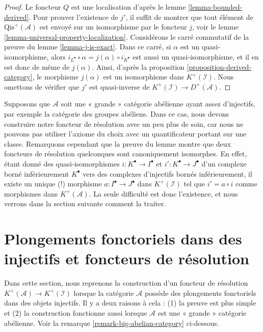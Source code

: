 \begin{proof}
Le foncteur $Q$ est une localisation d'après le
lemme \ref{lemma-bounded-derived}. Pour prouver l'existence de $j'$, il suffit
de montrer que tout élément de $\text{Qis}^{+}(\mathcal{A})$ est envoyé sur
un isomorphisme par le foncteur $j$, voir le
lemme \ref{lemma-universal-property-localization}.
Considérons le carré commutatif de la preuve du
lemme \ref{lemma-j-is-exact}. Dans ce carré, si $\alpha$ est un
quasi-isomorphisme, alors
$i_{L^\bullet}\circ\alpha=j(\alpha)\circ i_{K^\bullet}$ est aussi un
quasi-isomorphisme, et il en est donc de même de $j(\alpha)$. Ainsi, d'après
la proposition \ref{proposition-derived-category}, le morphisme $j(\alpha)$
est un isomorphisme dans $K^+(\mathcal{I})$. Nous omettons de vérifier que
$j'$ est quasi-inverse de
$K^{+}(\mathcal{I}) \to D^{+}(\mathcal{A})$.
\end{proof}

\begin{remark}
\label{remark-big-localization}
Supposons que $\mathcal{A}$ soit une « grande » catégorie abélienne ayant
assez d'injectifs, par exemple la catégorie des groupes abéliens. Dans ce cas,
nous devons construire notre foncteur de résolution avec un peu plus de soin,
car nous ne pouvons pas utiliser l'axiome du choix avec un quantificateur
portant sur une classe. Remarquons cependant que la preuve du lemme montre que
deux foncteurs de résolution quelconques sont canoniquement isomorphes. En
effet, étant donné des quasi-isomorphismes
$i : K^\bullet \to I^\bullet$ et $i' : K^\bullet \to J^\bullet$ d'un
complexe borné inférieurement $K^\bullet$ vers des complexes d'injectifs
bornés inférieurement, il existe un unique (!) morphisme
$a : I^\bullet \to J^\bullet$ dans $K^{+}(\mathcal{I})$ tel que
$i' = a \circ i$ comme morphismes dans $K^{+}(\mathcal{A})$. La seule
difficulté est donc l'existence, et nous verrons dans la section suivante
comment la traiter.
\end{remark}


\section{Plongements fonctoriels dans des injectifs et foncteurs de
résolution}
\label{section-functorial-injective-resolutions}

\noindent
Dans cette section, nous reprenons la construction d'un foncteur de résolution
$K^{+}(\mathcal{A}) \to K^{+}(\mathcal{I})$ lorsque la catégorie
$\mathcal{A}$ possède des plongements fonctoriels dans des objets injectifs.
Il y a deux raisons à cela : (1) la preuve est plus simple et (2) la
construction fonctionne aussi lorsque $\mathcal{A}$ est une « grande »
catégorie abélienne. Voir la remarque
\ref{remark-big-abelian-category} ci-dessous.

